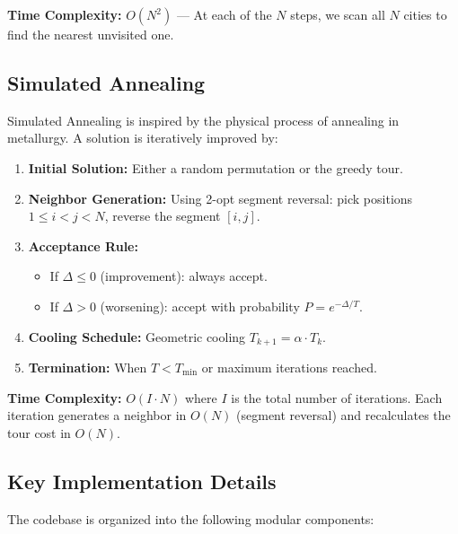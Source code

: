 \documentclass[12pt,a4paper]{article}
\begin{document}
\textbf{Time Complexity:} $O(N^2)$ --- At each of the $N$ steps, we scan all $N$ cities to find the nearest unvisited one.

\subsection{Simulated Annealing}

Simulated Annealing is inspired by the physical process of annealing in metallurgy. A solution is iteratively improved by:

\begin{enumerate}
    \item \textbf{Initial Solution:} Either a random permutation or the greedy tour.
    \item \textbf{Neighbor Generation:} Using 2-opt segment reversal: pick positions $1 \leq i < j < N$, reverse the segment $[i, j]$.
    \item \textbf{Acceptance Rule:}
    \begin{itemize}
        \item If $\Delta \leq 0$ (improvement): always accept.
        \item If $\Delta > 0$ (worsening): accept with probability $P = e^{-\Delta/T}$.
    \end{itemize}
    \item \textbf{Cooling Schedule:} Geometric cooling $T_{k+1} = \alpha \cdot T_k$.
    \item \textbf{Termination:} When $T < T_{\min}$ or maximum iterations reached.
\end{enumerate}

\textbf{Time Complexity:} $O(I \cdot N)$ where $I$ is the total number of iterations. Each iteration generates a neighbor in $O(N)$ (segment reversal) and recalculates the tour cost in $O(N)$.

\subsection{Key Implementation Details}

The codebase is organized into the following modular components:
\end{document}
